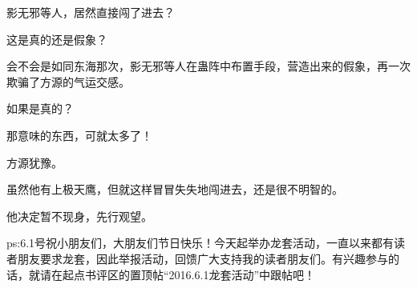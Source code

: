 \begin{this_body}
影无邪等人，居然直接闯了进去？

这是真的还是假象？

会不会是如同东海那次，影无邪等人在蛊阵中布置手段，营造出来的假象，再一次欺骗了方源的气运交感。

如果是真的？

那意味的东西，可就太多了！

方源犹豫。

虽然他有上极天鹰，但就这样冒冒失失地闯进去，还是很不明智的。

他决定暂不现身，先行观望。

ps:6.1号祝小朋友们，大朋友们节日快乐！今天起举办龙套活动，一直以来都有读者朋友要求龙套，因此举报活动，回馈广大支持我的读者朋友们。有兴趣参与的话，就请在起点书评区的置顶帖“2016.6.1龙套活动”中跟帖吧！

\end{this_body}

